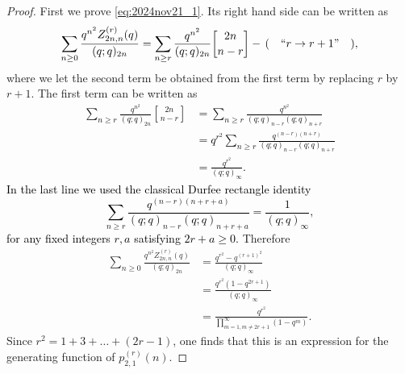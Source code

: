\documentclass[sn-mathphys-num]{sn-jnl}%
\newcommand{\red}[1]{\textcolor{black}{#1}}
\theoremstyle{thmstyleone}%
\theoremstyle{thmstyletwo}%
\theoremstyle{thmstylethree}%
\begin{document}
\begin{proof}
First we prove \eqref{eq:2024nov21_1}.
Its right hand side can be written as
\begin{equation*}
\sum_{n \geq 0} \frac{q^{n^2} Z_{2n,n}^{(r)}(q)}{(q;q)_{2n}} =
\sum_{n \geq r} \frac{q^{n^2} }{(q;q)_{2n}} { 2n \brack n-r } \\
- \, ( \quad ``r \rightarrow r + 1" \quad ),
\end{equation*}
where we let the second term be obtained from the first term
by replacing $r$ by $r +1$.
The first term can be written as
\red{
\begin{align}
\sum_{n \geq r} \frac{q^{n^2} }{(q;q)_{2n}} { 2n \brack n-r }  &=
\sum_{n \geq r} \frac{q^{n^2} }{(q;q)_{n-r} (q;q)_{n+r}} \nonumber\\
&=
q^{r^2}\sum_{n \geq r} \frac{q^{(n-r)(n+r)} }{(q;q)_{n-r} (q;q)_{n+r}} \nonumber\\
&= 
\frac{q^{r^2}}{(q;q)_{\infty}}.\label{eq:2025june23_1}
\end{align}
In the last line we used the classical Durfee rectangle identity
\begin{equation}\label{eq:2024july11_3}
\sum_{n \geq r} \frac{q^{(n-r)(n+r+a)} }{(q;q)_{n-r} (q;q)_{n+r+a}} = \frac{1}{(q;q)_{\infty}},
\end{equation}
for any fixed integers $r, a$ satisfying $2r+a \geq 0$.}
Therefore
\begin{align*}
\sum_{n \geq 0} \frac{q^{n^2} Z_{2n,n}^{(r)}(q)}{(q;q)_{2n}} &=
\frac{q^{r^2} - q^{(r+1)^2}}{(q;q)_{\infty}} \\
&= 
\frac{q^{r^2}(1 - q^{2r+1})}{(q;q)_{\infty}} \\
&= \frac{q^{r^2}}{\prod_{m=1, m \ne 2r+1}^\infty (1-q^m)}.
\end{align*}
Since $r^2 = 1 + 3 + \dots + (2 r-1)$, one finds that
this is an expression for the generating function of $p^{(r)}_{2,1}(n)$.



\end{proof}
\end{document}
